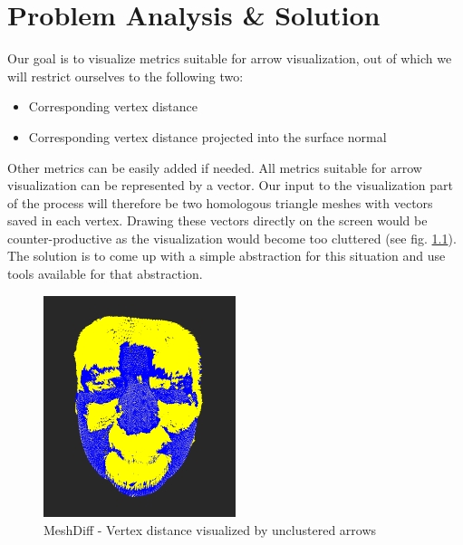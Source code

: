 \chapter{Problem Analysis \& Solution}

Our goal is to visualize metrics suitable for arrow visualization, out of which we will restrict ourselves to the following two:

\begin{itemize}
\item Corresponding vertex distance
\item Corresponding vertex distance projected into the surface normal
\end{itemize}

Other metrics can be easily added if needed. All metrics suitable for arrow visualization can be represented by a vector. Our input to the visualization part of the process will therefore be two homologous triangle meshes with vectors saved in each vertex. Drawing these vectors directly on the screen would be counter-productive as the visualization would become too cluttered (see fig. \ref{fig:meshdiff_unclustered}). The solution is to come up with a simple abstraction for this situation and use tools available for that abstraction.

\begin{figure}[h]
\centering
\includegraphics[width=0.5\textwidth]{./img/meshdiff-unclustered_arrows-single.png}
\caption{MeshDiff - Vertex distance visualized by unclustered arrows}
\label{fig:meshdiff_unclustered}
\end{figure}

